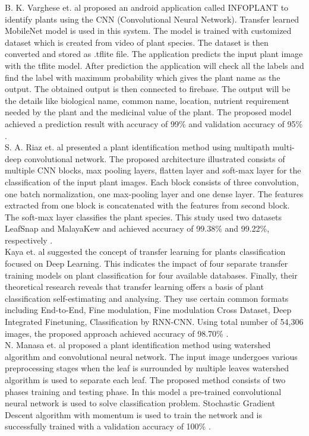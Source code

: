 B. K. Varghese et. al proposed an 
android application called INFOPLANT to identify plants using the 
CNN (Convolutional Neural Network). Transfer learned MobileNet model is 
used in this system. The model is trained with customized dataset which 
is created from video of plant species. The dataset is then converted and 
stored as .tflite file. The application predicts the input plant image with 
the tflite model. After prediction the application will check all the labels 
and find the label with maximum probability which gives the plant name as 
the output. The obtained output is then connected to firebase. The output 
will be the details like biological name, common name, location, nutrient 
requirement needed by the plant and the medicinal value of the plant. The 
proposed model achieved a prediction result with accuracy 
of 99\% and validation accuracy of 95\% \cite{var20}. \\

S. A. Riaz et. al presented a plant identification method 
using multipath multi-deep convolutional network. The proposed architecture 
illustrated consists of multiple CNN blocks, max pooling layers, flatten layer 
and soft-max layer for the classification of the input plant images. Each block 
consists of three convolution, one batch normalization, one max-pooling layer
and one dense layer. The features extracted from one block is concatenated with 
the features from second block. The soft-max layer classifies the plant species.
This study used two datasets LeafSnap and MalayaKew and achieved accuracy of 
99.38\% and 99.22\%, respectively \cite{rai20}. \\

Kaya et. al suggested the concept of transfer learning for plants classification 
focused on Deep Learning. This indicates the impact of four separate transfer 
training models on plant classification for four available databases. 
Finally, their theoretical research reveals that transfer learning offers 
a basis of plant classification self-estimating and analysing. They use certain 
common formats including End-to-End, Fine modulation, Fine modulation Cross
Dataset, Deep Integrated Finetuning, Classification by RNN-CNN. Using total 
number of 54,306 images, the proposed approach achieved accuracy 
of 98.70\% \cite{kay19}. \\

N. Manasa et. al proposed a plant identification method using watershed 
algorithm and convolutional neural network. The input image undergoes various 
preprocessing stages when the leaf is surrounded by multiple leaves watershed 
algorithm is used to separate each leaf. The proposed method consists of two 
phases training and testing phase. In this model a pre-trained convolutional 
neural network is used to solve classification problem. Stochastic Gradient 
Descent algorithm with momentum is used to train the network  and is successfully 
trained with a validation accuracy of 100\% \cite{man19}. \\

